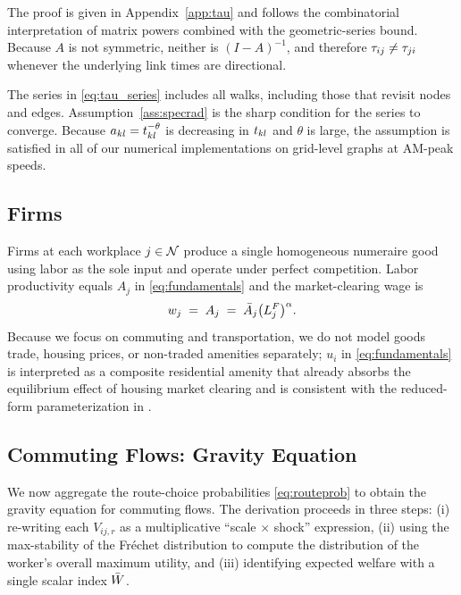 The proof is given in Appendix~\ref{app:tau} and follows the
combinatorial interpretation of matrix powers combined with the
geometric-series bound.  Because $A$ is not symmetric, neither is
$(I-A)^{-1}$, and therefore $\tau_{ij}\neq\tau_{ji}$ whenever the
underlying link times are directional.

\begin{remark}
\label{rem:cycles}
The series in \eqref{eq:tau_series} includes all walks, including
those that revisit nodes and edges.  Assumption~\ref{ass:specrad} is
the sharp condition for the series to converge.  Because
$a_{kl}=t_{kl}^{-\theta}$ is decreasing in $t_{kl}$ and $\theta$ is large,
the assumption is satisfied in all of our numerical implementations
on grid-level graphs at AM-peak speeds.
\end{remark}

\subsection{Firms}\label{ssec:firms}

Firms at each workplace $j\in\mathcal N$ produce a single homogeneous
numeraire good using labor as the sole input and operate under
perfect competition.  Labor productivity equals $A_j$ in
\eqref{eq:fundamentals} and the market-clearing wage is
\begin{equation}
  w_j\;=\;A_j\;=\;\bar A_j\bigl(L_j^F\bigr)^{\alpha}.
  \label{eq:wage}
\end{equation}
Because we focus on commuting and transportation, we do not model
goods trade, housing prices, or non-traded amenities separately;
$u_i$ in \eqref{eq:fundamentals} is interpreted as a composite
residential amenity that already absorbs the equilibrium effect of
housing market clearing and is consistent with the reduced-form
parameterization in \cite{AllenArkolakis2022}.

\subsection{Commuting Flows: Gravity Equation}\label{ssec:gravity}

We now aggregate the route-choice probabilities \eqref{eq:routeprob}
to obtain the gravity equation for commuting flows.  The derivation
proceeds in three steps: (i) re-writing each $V_{ij,r}$ as a
multiplicative ``scale $\times$ shock'' expression, (ii) using the
max-stability of the Fr\'echet distribution to compute the
distribution of the worker's overall maximum utility, and
(iii) identifying expected welfare with a single scalar index
$\bar W$.

